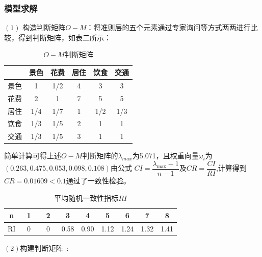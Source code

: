 \documentclass[a4paper]{article}
\begin{document}
    \subsubsection{模型求解}
    $ \left( 1\right) $ 构造判断矩阵$O-M$：将准则层的五个元素通过专家询问等方式两两进行比较，得到判断矩阵，如表二所示：
    \begin{table}[H]
    \centering
    \caption{$ O-M $判断矩阵}
    \label{tab:my-table}
    \begin{tabular}{@{}cccccc@{}}
    \toprule
       & 景色  & 花费  & 居住 & 饮食  & 交通  \\ \midrule
    景色 & 1   & 1/2 & 4  & 3   & 3   \\
    花费 & 2   & 1   & 7  & 5   & 5   \\
    居住 & 1/4 & 1/7 & 1  & 1/2 & 1/3 \\ 
    饮食 & 1/3 & 1/5 & 2  & 1   & 1   \\ 
    交通 & 1/3 & 1/5 & 3  & 1   & 1   \\ \bottomrule
    \end{tabular}
    \end{table}
    简单计算可得上述$ O-M $判断矩阵的$ \lambda_{max} $为5.071，且权重向量$ \omega_{i}$为$\left( 0.263,0.475,0.053,0.098,0.108\right) $由公式 $CI=\dfrac{\lambda _{\max}-1}{n-1} $及$CR=\dfrac{CI}{RI}$,计算得到$ CR = 0.01609 < 0.1 $通过了一致性检验。
    \begin{table}[H]
    \centering
    \caption{平均随机一致性指标$ RI $}
    \begin{tabular}{|c|c|c|c|c|c|c|c|c|}
    \hline
    n  & ~1~ & ~2~  & 3    & 4    & 5    & 6    & 7    & 8    \\ \hline
    RI & ~0~ & ~0~  & 0.58 & 0.90 & 1.12 & 1.24 & 1.32 & 1.41 \\ \hline
    \end{tabular}
    \end{table}
    $ \left( 2\right)  $构建判断矩阵~:\\
\end{document}
